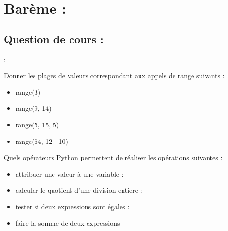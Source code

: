 \documentclass[a4paper, noanswers, addpoints, 12pt]{exam}
\begin{document}
\section*{Barème :}
\begin{center}
  \par\bigskip
  \gradetable[h]
\end{center}
\begin{questions}

\section{Question de cours : }

\question[2]  :

\question[2] Donner les plages de valeurs correspondant aux appels de range suivants :
\begin{itemize}
    \item range(3)
    \item range(9, 14)
    \item range(5, 15, 5)
    \item range(64, 12, -10)
\end{itemize}

\question[2] Quels opérateurs Python permettent de réaliser les opérations suivantes :
\begin{itemize}
    \item attribuer une valeur à une variable :
    \item calculer le quotient d'une division entiere :
    \item tester si deux expressions sont égales :
    \item faire la somme de deux expressions :
\end{itemize}
 

\end{questions}
\end{document}

